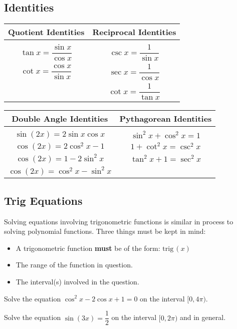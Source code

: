 \documentclass[notes]{subfiles}
\begin{document}
	\subsection*{Identities}
		\begin{center}
			\setlength{\arrayrulewidth}{1.5pt}
			\renewcommand{\arraystretch}{1.5}
			\begin{tabular}{|c|c|} \hline
				{\large \textbf{Quotient Identities}} & {\large \textbf{Reciprocal Identities}}\\ \hline
				& \\[-15pt]
				\(\tan x = \dfrac{\sin x}{\cos x}\) & \(\csc x = \dfrac{1}{\sin x}\) \\[15pt]
				\(\cot x = \dfrac{\cos x}{\sin x}\) & \(\sec x = \dfrac{1}{\cos x}\) \\[15pt]
										& \(\cot x = \dfrac{1}{\tan x}\) \\[15pt] \hline
			\end{tabular}
		\end{center}
			
		\begin{center}
			\setlength{\arrayrulewidth}{1.5pt}
			\renewcommand{\arraystretch}{1.5}
			\begin{tabular}{|c|c|} \hline
				{\large \textbf{Double Angle Identities}} & {\large \textbf{Pythagorean Identities}} \\ \hline
				& \\[-15pt]
				\(\sin (2x) = 2\sin x\cos x\) & \(\sin^2 x + \cos^2 x =1 \) \\ 
				\(\cos (2x) = 2\cos^2x - 1\) & \(1 + \cot^2 x = \csc^2x\) \\
				\(\cos (2x) = 1-2\sin^2x\) & \(\tan^2 x + 1 = \sec^2 x\) \\
				\(\cos (2x) = \cos^2x-\sin^2x\) & \\ \hline
			\end{tabular}
		\end{center}
	\subsection*{Trig Equations}
		\begin{rmk}
			Solving equations involving trigonometric functions is similar in process to solving polynomial functions. Three things must be kept in mind:
			\begin{itemize}
				\item A trigonometric function \textbf{must} be of the form: \(\text{trig}\,(x)\)
				\item The range of the function in question.
				\item The interval(s) involved in the question.
			\end{itemize}
		\end{rmk}
			\newpage
			
		\begin{ex}
			Solve the equation \(\cos^2x - 2\cos x + 1 = 0\) on the interval \([0,4\pi)\).
		\end{ex}
			
		\begin{ex}
			Solve the equation \(\sin (3x) = \dfrac{1}{2}\) on the interval \([0,2\pi)\) and in general.
		\end{ex}
		
\clearpage
\end{document}
